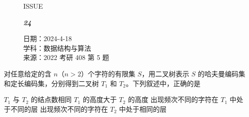 \documentclass[UTF8]{ctexart}
\newcommand\Black[1]{\textcolor[gray]{0.3}{#1}}
\newcommand\Brown[1]{\textcolor[HTML]{998A4E}{#1}}
\newcommand\IssueNumber{24}
\newcommand\Date{2024-4-18}
\newcommand\Subject{数据结构与算法}
\newcommand\Source{2022 考研 408 第 5 题}
\begin{document}
\begin{figure}[H]
\hspace{1cm}
\begin{minipage}[t]{0.3\textwidth}
\centering
    \Brown{\Genshin ISSUE}

    \vspace{-0.6cm}
    \Huge \Issue\slshape\bfseries\Black{\IssueNumber}
\end{minipage}
\hfill
\begin{minipage}[t]{0.35\textwidth}
\small
\centering
    \Brown{日期：\Date} \\
\vspace{-0.1cm}
    \Brown{学科：\Subject} \\
\vspace{-0.1cm}
    \Brown{来源：\Source}
\end{minipage}
\hspace{0.8cm}
\end{figure}

{\color{cyan!50!black}
对任意给定的含 $n$（$n>2$）个字符的有限集 $S$，用二叉树表示 $S$ 的哈夫曼编码集和定长编码集，分别得到二叉树 $T_1$ 和 $T_2$。下列叙述中，正确的是
{
\begin{tasks}[after-item-skip = 0pt]
    \task \color{cyan!50!black}  $T_1$ 与 $T_2$ 的结点数相同
    \task \color{cyan!50!black}  $T_1$ 的高度大于 $T_2$ 的高度
    \task \color{cyan!50!black}  出现频次不同的字符在 $T_1$ 中处于不同的层
    \task \color{cyan!50!black}  出现频次不同的字符在 $T_2$ 中处于相同的层
\end{tasks}
}}
\end{document}
